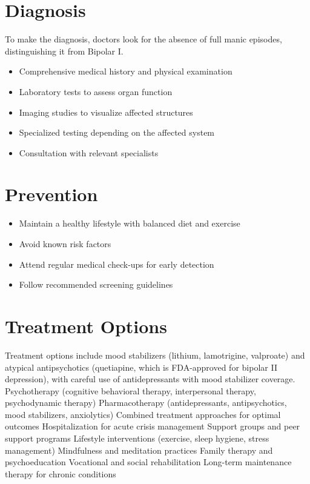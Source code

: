 \section{Diagnosis}
To make the diagnosis, doctors look for the absence of full manic episodes, distinguishing it from Bipolar I.

\begin{itemize}[noitemsep]
  \item Comprehensive medical history and physical examination
  \item Laboratory tests to assess organ function
  \item Imaging studies to visualize affected structures
  \item Specialized testing depending on the affected system
  \item Consultation with relevant specialists
\end{itemize}
\section{Prevention}
\begin{itemize}[noitemsep]
  \item Maintain a healthy lifestyle with balanced diet and exercise
  \item Avoid known risk factors
  \item Attend regular medical check-ups for early detection
  \item Follow recommended screening guidelines
\end{itemize}
\section{Treatment Options}
Treatment options include mood stabilizers (lithium, lamotrigine, valproate) and atypical antipsychotics (quetiapine, which is FDA-approved for bipolar II depression), with careful use of antidepressants with mood stabilizer coverage. Psychotherapy (cognitive behavioral therapy, interpersonal therapy, psychodynamic therapy) Pharmacotherapy (antidepressants, antipsychotics, mood stabilizers, anxiolytics) Combined treatment approaches for optimal outcomes Hospitalization for acute crisis management Support groups and peer support programs Lifestyle interventions (exercise, sleep hygiene, stress management) Mindfulness and meditation practices Family therapy and psychoeducation Vocational and social rehabilitation Long-term maintenance therapy for chronic conditions

